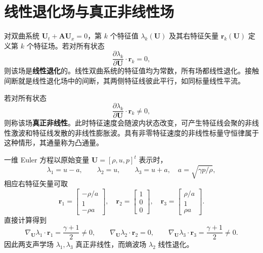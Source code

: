 \documentclass[11pt,a4paper,openany,fontset=none]{ctexbook}
\begin{document}
\section{线性退化场与真正非线性场}

对双曲系统 $\bm U_t+\bm A\bm U_x=0$，第 $k$ 个特征值 $\lambda_k(\bm U)$ 及其右特征矢量 $\bm r_k(\bm U)$ 定义第 $k$ 个特征场。若对所有状态
\begin{equation}
 \frac{\partial\lambda_k}{\partial\bm U}\cdot\bm r_k=0, \tag{1.23.2}
\end{equation}
则该场是\textbf{线性退化}的。线性双曲系统的特征值均为常数，所有场都线性退化。接触间断就是线性退化场中的间断，其两侧特征线彼此平行，如同标量线性平流。

若对所有状态
\begin{equation}
 \frac{\partial\lambda_k}{\partial\bm U}\cdot\bm r_k\ne0, \tag{1.23.3}
\end{equation}
则称该场\textbf{真正非线性}。此时特征速度会随波内状态改变，可产生特征线会聚的非线性激波和特征线发散的非线性膨胀波。具有非零特征速度的非线性标量守恒律属于这种情形，其通量称为凸通量。

一维 Euler 方程以原始变量 $\bm U=[\rho,u,p]^t$ 表示时，
\begin{equation}
 \lambda_1=u-a,\qquad\lambda_2=u,\qquad\lambda_3=u+a,
 \quad a=\sqrt{\gamma p/\rho}, \tag{1.23.4}
\end{equation}
相应右特征矢量可取
\begin{equation}
 \bm r_1=\begin{bmatrix}-\rho/a\\1\\-\rho a\end{bmatrix},\quad
 \bm r_2=\begin{bmatrix}1\\0\\0\end{bmatrix},\quad
 \bm r_3=\begin{bmatrix}\rho/a\\1\\\rho a\end{bmatrix}. \tag{1.23.5}
\end{equation}
直接计算得到
\begin{equation}
 \nabla_{\bm U}\lambda_1\cdot\bm r_1=\frac{\gamma+1}{2}\ne0,\qquad
 \nabla_{\bm U}\lambda_2\cdot\bm r_2=0,\qquad
 \nabla_{\bm U}\lambda_3\cdot\bm r_3=\frac{\gamma+1}{2}\ne0. \tag{1.23.6--8}
\end{equation}
因此两支声学场 $\lambda_1,\lambda_3$ 真正非线性，而熵波场 $\lambda_2$ 线性退化。
\end{document}
